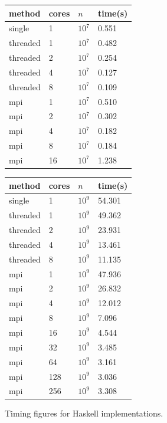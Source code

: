 \documentclass{tmr}
\begin{document}
\begin{figure}
\begin{minipage}[b]{0.5\linewidth}\centering
\begin{tabular}{|l|l|l|l|} \hline
method & cores & $n$ & time(s) \\ \hline\hline
single & 1     & $10^7$ & 0.551 \\ \hline\hline
threaded & 1   & $10^7$ & 0.482 \\ \hline
threaded & 2   & $10^7$ & 0.254 \\ \hline
threaded & 4   & $10^7$ & 0.127 \\ \hline
threaded & 8   & $10^7$ & 0.109 \\ \hline\hline
mpi & 1   & $10^7$ & 0.510 \\ \hline
mpi & 2   & $10^7$ & 0.302  \\ \hline
mpi & 4   & $10^7$ & 0.182  \\ \hline
mpi & 8   & $10^7$ & 0.184 \\ \hline
mpi & 16  & $10^7$ & 1.238 \\ \hline
\end{tabular}
\end{minipage}
\hspace{0.5cm}
\begin{minipage}[b]{0.5\linewidth}
\centering
\begin{tabular}{|l|l|l|l|} \hline
method & cores & $n$ & time(s) \\ \hline\hline
single & 1     & $10^9$ & 54.301 \\ \hline\hline
threaded & 1   & $10^9$ & 49.362 \\ \hline
threaded & 2   & $10^9$ & 23.931 \\ \hline
threaded & 4   & $10^9$ & 13.461  \\ \hline
threaded & 8   & $10^9$ & 11.135 \\ \hline\hline
mpi & 1   & $10^9$ & 47.936 \\ \hline
mpi & 2   & $10^9$ & 26.832  \\ \hline
mpi & 4   & $10^9$ & 12.012 \\ \hline
mpi & 8   & $10^9$ & 7.096 \\ \hline
mpi & 16  & $10^9$ & 4.544 \\ \hline
mpi & 32 & $10^9$ & 3.485 \\ \hline
mpi & 64   & $10^9$ & 3.161 \\ \hline
mpi & 128   & $10^9$ & 3.036 \\ \hline
mpi & 256 & $10^9$ & 3.308 \\ \hline
\end{tabular}
\end{minipage}
\vspace{3mm}
\caption{Timing figures for Haskell implementations. \label{TiminigTable}}
\end{figure}
\end{document}
